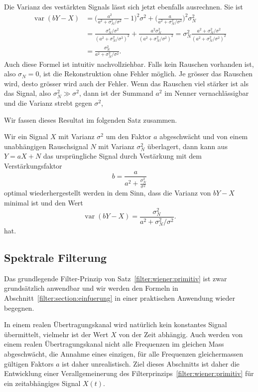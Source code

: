 Die Varianz des vestärkten Signals lässt sich jetzt ebenfalls
ausrechnen.
Sie ist
\begin{align*}
\operatorname{var}(bY-X)
&=
\biggl(\frac{a^2}{a^2+\sigma_N^2/\sigma^2}-1\biggr)^2\sigma^2
+
\biggl(\frac{a}{a^2+\sigma_N^2/\sigma^2}\biggr)^2 \sigma_N^2
\\
&=
\frac{\sigma_N^4/\sigma^2}{(a^2+\sigma_N^2/\sigma^2)^2}
+
\frac{a^2\sigma_N^2}{(a^2+\sigma_N^2/\sigma^2)^2}
=
\sigma_N^2\frac{a^2+\sigma_N^2/\sigma^2}{(a^2+\sigma_N^2/\sigma^2)^2}
\\
&=
\frac{\sigma_N^2}{a^2+\sigma_N^2/\sigma^2}.
\end{align*}
Auch diese Formel ist intuitiv nachvollziehbar.
Falls kein Rauschen vorhanden ist, also $\sigma_N=0$, ist die Rekonstruktion
ohne Fehler möglich.
Je grösser das Rauschen wird, desto grösser wird auch der Fehler.
Wenn das Rauschen viel stärker ist als das Signal,
also $\sigma_N^2 \gg \sigma^2$, dann ist der Summand $a^2$ im
Nenner vernachlässigbar und die Varianz strebt gegen $\sigma^2$,


Wir fassen dieses Resultat im folgenden Satz zusammen.

\begin{satz}[Wiener]
\label{filter:wiener:primitiv}
Wir ein Signal $X$ mit Varianz $\sigma^2$ um den Faktor $a$ abgeschwächt
und von einem unabhängigen Rauschsignal $N$ mit Varianz $\sigma_N^2$
überlagert, dann kann aus $Y=aX+N$ das ursprüngliche Signal durch
Vestärkung mit dem Verstärkungsfaktor
\[
b=\frac{a}{a^2 + \displaystyle\frac{\sigma_N^2}{\sigma^2}}
\]
optimal wiederhergestellt werden in dem Sinn, dass die Varianz
von $bY-X$ minimal ist und den Wert
\[
\operatorname{var}(bY-X)
=
\frac{\sigma_N^2}{a^2+\sigma_N^2/\sigma^2}.
\]
hat.
\end{satz}


\subsection{Spektrale Filterung
\label{filter:wiener:subsection:spektral}}
Das grundlegende Filter-Prinzip von Satz~\ref{filter:wiener:primitiv}
ist zwar grundsätzlich anwendbar und wir werden den Formeln in
Abschnitt~\ref{filter:section:einfuerung} in einer praktischen 
Anwendung wieder begegnen.

In einem realen Übertragungskanal wird natürlich kein konstantes Signal
übermittelt,
vielmehr ist der Wert $X$ von der Zeit abhängig.
Auch werden von einem realen Übertragungskanal nicht alle Frequenzen
im gleichen Mass abgeschwächt, die Annahme eines einzigen, für alle
Frequenzen gleichermassen gültigen Faktors $a$ ist daher unrealistisch.
Ziel dieses Abschnitts ist daher die Entwicklung einer Verallgemeinerung
des Filterprinzips~\ref{filter:wiener:primitiv} für ein zeitabhängiges
Signal $X(t)$.

